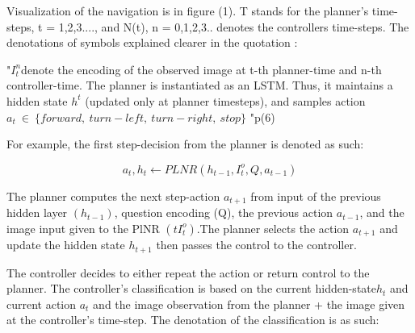Visualization of the navigation is in figure (1). T stands for the planner's time-steps, t = 1,2,3...., and N(t),  n = 0,1,2,3.. denotes the controllers time-steps. The denotations of symbols explained clearer in the quotation : 


"\begin{math}  I_{t}^{n} \end{math}denote the encoding of the observed image at t-th planner-time and n-th controller-time. The planner is instantiated as an LSTM. Thus, it maintains a hidden state \begin{math} h^{t}\end{math}
(updated only at planner timesteps), and samples action 
\begin{math}  a_{t} \ \in \ \{forward,\ turn-left,\ turn-right,\ stop\} \end{math} "p(6)
\vspace{0.3cm}

For example, the first  step-decision from the planner is denoted as such: 

\[ a_{t} ,h_{t}{}\leftarrow PLNR\left( h_{t-1} ,I_{t}^{o} ,Q,a_{t-1}\right) \]
        


The planner computes the next step-action  \begin{math} a_{t+1} \end{math} from input of the previous hidden layer \begin{math} (h_{t-1}) \end{math}, question encoding (Q), the previous action  \begin{math} a_{t-1} \end{math}, and the image input given to the PlNR \begin{math} (tI_{t}^{o}) \end{math}.The planner selects the action \begin{math} a_{t+1}\end{math} and update the hidden state \begin{math} h_{t+1} \end{math} then passes the control to the controller. 




The controller decides to either repeat the action or return control to the planner. The controller's classification is based on the current hidden-state\begin{math} h_{t}  \end{math} and current action \begin{math} a_{t} \end{math} and the image observation from the planner + the image given at the controller's time-step. The denotation of the classification is as such: 

